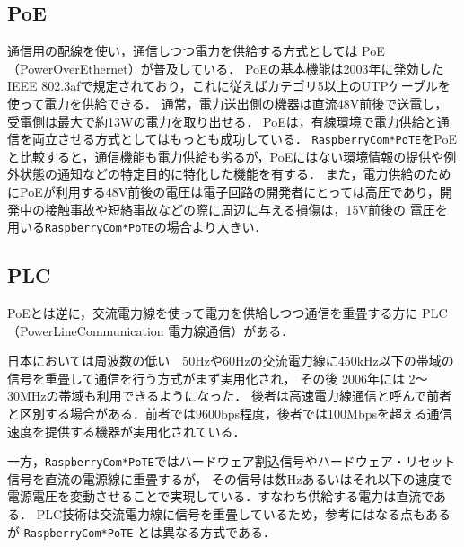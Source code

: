 


\subsection{PoE}

通信用の配線を使い，通信しつつ電力を供給する方式としては PoE（PowerOverEthernet）が普及している．
PoEの基本機能は2003年に発効したIEEE 802.3afで規定されており，これに従えばカテゴリ5以上のUTPケーブルを使って電力を供給できる．
通常，電力送出側の機器は直流48V前後で送電し，受電側は最大で約13Wの電力を取り出せる．
PoEは，有線環境で電力供給と通信を両立させる方式としてはもっとも成功している．
{\tt Raspberry\-Com*PoTE}をPoEと比較すると，通信機能も電力供給も劣るが，PoEにはない環境情報の提供や例外状態の通知などの特定目的に特化した機能を有する．
また，電力供給のためにPoEが利用する48V前後の電圧は電子回路の開発者にとっては高圧であり，開発中の接触事故や短絡事故などの際に周辺に与える損傷は，15V前後の
電圧を用いる{\tt Raspberry\-Com*PoTE}の場合より大きい．


\subsection{PLC}

PoEとは逆に，交流電力線を使って電力を供給しつつ通信を重畳する方に PLC（PowerLineCommunication 電力線通信）がある．


日本においては周波数の低い　50Hzや60Hzの交流電力線に450kHz以下の帯域の信号を重畳して通信を行う方式がまず実用化され，
その後 2006年には 2〜30MHzの帯域も利用できるようになった．
後者は高速電力線通信と呼んで前者と区別する場合がある．前者では9600bps程度，後者では100Mbpsを超える通信速度を提供する機器が実用化されている．

一方，{\tt Raspberry\-Com*PoTE}ではハードウェア割込信号やハードウェア・リセット信号を直流の電源線に重畳するが，
その信号は数Hzあるいはそれ以下の速度で電源電圧を変動させることで実現している．すなわち供給する電力は直流である．
PLC技術は交流電力線に信号を重畳しているため，参考にはなる点もあるが {\tt Raspberry\-Com*PoTE} とは異なる方式である．


